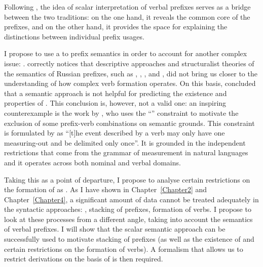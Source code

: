 Following \citet{Filip:08}, the idea of scalar interpretation of verbal prefixes serves as a bridge between the two traditions: on the one hand, it reveals the common core of the prefixes, and on the other hand, it provides the space for explaining the distinctions between individual prefix usages. 

I propose to use a  to prefix semantics in order to account for another complex issue: . \citet{Tatevosov:09} correctly notices that descriptive approaches and structuralist theories of the semantics of Russian prefixes, such as \citet{Avilova:64}, \citet{Golovin:59}, \citet{Lopatin:97}, and \citet{Tixonov:98}, did not bring us closer to the understanding of how complex verb formation operates. On this basis, \citet{Tatevosov:09} concluded that a semantic approach is not helpful for predicting the existence and properties of . This conclusion is, however, not a valid one: an inspiring counterexample is the work by \citet{Filip:03}, who uses the ``'' constraint to motivate the exclusion of some prefix-verb combinations on semantic grounds. This constraint is formulated by \citet[79]{Tenny:94} as ``[t]he event described by a verb may only have one measuring-out and be delimited only once''. It is grounded in the independent restrictions that come from the grammar of measurement in natural languages and it operates across both nominal and verbal domains. 

Taking this as a point of departure, I propose to analyse certain restrictions on the formation of  as . As I have shown in Chapter~\ref{Chapter2} and Chapter~\ref{Chapter4}, a significant amount of data cannot be treated adequately in the syntactic approaches: , stacking of prefixes, formation of  verbs. I propose to look at these processes from a different angle, taking into account the semantics of verbal prefixes. I will show that the scalar semantic approach can be successfully used to motivate stacking of prefixes (as well as the existence of  and certain restrictions on the formation of  verbs). A formalism that allows us to restrict derivations on the basis of  is then required. 


